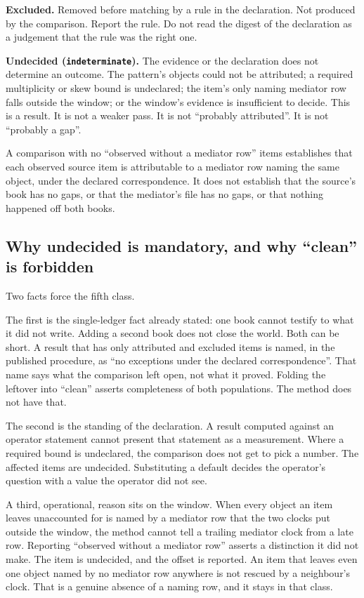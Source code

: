 \documentclass[11pt]{article}
\begin{document}
\textbf{Excluded.} Removed before matching by a rule in the declaration. Not produced by the comparison. Report the rule. Do not read the digest of the declaration as a judgement that the rule was the right one.

\textbf{Undecided (\texttt{indeterminate}).} The evidence or the declaration does not determine an outcome. The pattern's objects could not be attributed; a required multiplicity or skew bound is undeclared; the item's only naming mediator row falls outside the window; or the window's evidence is insufficient to decide. This is a result. It is not a weaker pass. It is not ``probably attributed''. It is not ``probably a gap''.

A comparison with no ``observed without a mediator row'' items establishes that each observed source item is attributable to a mediator row naming the same object, under the declared correspondence. It does not establish that the source's book has no gaps, or that the mediator's file has no gaps, or that nothing happened off both books.

\subsection{\texorpdfstring{Why undecided is mandatory, and why ``clean'' is forbidden}{Why undecided is mandatory, and why “clean” is forbidden}}

Two facts force the fifth class.

The first is the single-ledger fact already stated: one book cannot testify to what it did not write. Adding a second book does not close the world. Both can be short. A result that has only attributed and excluded items is named, in the published procedure, as ``no exceptions under the declared correspondence''. That name says what the comparison left open, not what it proved. Folding the leftover into ``clean'' asserts completeness of both populations. The method does not have that.

The second is the standing of the declaration. A result computed against an operator statement cannot present that statement as a measurement. Where a required bound is undeclared, the comparison does not get to pick a number. The affected items are undecided. Substituting a default decides the operator's question with a value the operator did not see.

A third, operational, reason sits on the window. When every object an item leaves unaccounted for is named by a mediator row that the two clocks put outside the window, the method cannot tell a trailing mediator clock from a late row. Reporting ``observed without a mediator row'' asserts a distinction it did not make. The item is undecided, and the offset is reported. An item that leaves even one object named by no mediator row anywhere is not rescued by a neighbour's clock. That is a genuine absence of a naming row, and it stays in that class.
\end{document}
